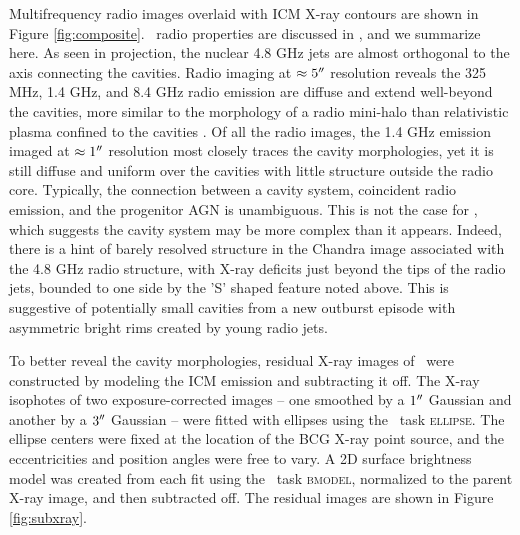 \documentclass[iop]{emulateapj}
\begin{document}
Multifrequency radio images overlaid with ICM X-ray contours are shown
in Figure \ref{fig:composite}. \rbs\ radio properties are discussed in
\citet{gitti06}, and we summarize here. As seen in projection, the
nuclear 4.8 GHz jets are almost orthogonal to the axis connecting the
cavities. Radio imaging at $\approx 5\rm{^\prime}\hskip -0.1em\rm{^\prime}$ resolution reveals the 325
MHz, 1.4 GHz, and 8.4 GHz radio emission are diffuse and extend
well-beyond the cavities, more similar to the morphology of a radio
mini-halo than relativistic plasma confined to the cavities
\citep[][Doria et al., in preparation]{2008A&A...486L..31C}. Of all
the radio images, the 1.4 GHz emission imaged at $\approx 1 \rm{^\prime}\hskip -0.1em\rm{^\prime}$
resolution most closely traces the cavity morphologies, yet it is
still diffuse and uniform over the cavities with little structure
outside the radio core. Typically, the connection between a cavity
system, coincident radio emission, and the progenitor AGN is
unambiguous. This is not the case for \rbs, which suggests the cavity
system may be more complex than it appears. Indeed, there is a hint of
barely resolved structure in the Chandra image associated with the 4.8
GHz radio structure, with X-ray deficits just beyond the tips of the
radio jets, bounded to one side by the 'S' shaped feature noted
above. This is suggestive of potentially small cavities from a new
outburst episode with asymmetric bright rims created by young radio
jets.

To better reveal the cavity morphologies, residual X-ray images of
\rbs\ were constructed by modeling the ICM emission and subtracting it
off. The X-ray isophotes of two exposure-corrected images -- one
smoothed by a $1\rm{^\prime}\hskip -0.1em\rm{^\prime}$ Gaussian and another by a $3\rm{^\prime}\hskip -0.1em\rm{^\prime}$ Gaussian --
were fitted with ellipses using the \iraf\ task \textsc{ellipse}. The
ellipse centers were fixed at the location of the BCG X-ray point
source, and the eccentricities and position angles were free to
vary. A 2D surface brightness model was created from each fit using
the \iraf\ task \textsc{bmodel}, normalized to the parent X-ray image,
and then subtracted off. The residual images are shown in Figure
\ref{fig:subxray}.
\end{document}
